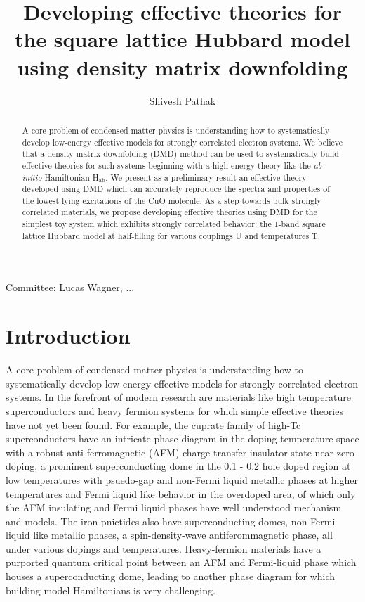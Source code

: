 \documentclass[12pt]{article}
\author{Shivesh Pathak}
\title{Developing effective theories for the square lattice Hubbard model using density matrix downfolding}
\begin{document}
\maketitle
\begin{abstract}
A core problem of condensed matter physics is understanding how to systematically develop low-energy effective models for strongly correlated electron systems. 
We believe that a density matrix downfolding (DMD) method can be used to systematically build effective theories for such systems beginning with a high energy theory like the \textit{ab-initio} Hamiltonian H$_\text{ab}$.
We present as a preliminary result an effective theory developed using DMD which can accurately reproduce the spectra and properties of the lowest lying excitations of the CuO molecule.
As a step towards bulk strongly correlated materials, we propose developing effective theories using DMD for the simplest toy system which exhibits strongly correlated behavior: the 1-band square lattice Hubbard model at half-filling for various couplings U and temperatures T.
\end{abstract}
Committee: Lucas Wagner, ...
\pagebreak

\section{Introduction}
A core problem of condensed matter physics is understanding how to systematically develop low-energy effective models for strongly correlated electron systems. 
In the forefront of modern research are materials like high temperature superconductors and heavy fermion systems for which simple effective theories have not yet been found. 
For example, the cuprate family of high-Tc superconductors have an intricate phase diagram in the doping-temperature space  with a robust anti-ferromagnetic (AFM) charge-transfer insulator state near zero doping, a prominent superconducting dome in the 0.1 - 0.2 hole doped region at low temperatures with psuedo-gap and non-Fermi liquid metallic phases at higher temperatures and Fermi liquid like behavior in the overdoped area, of which only the AFM insulating and Fermi liquid phases have well understood mechanism and models. 
The iron-pnictides also have superconducting domes, non-Fermi liquid like metallic phases, a spin-density-wave antiferommagnetic phase, all under various dopings and temperatures. 
Heavy-fermion materials have a purported quantum critical point between an AFM and Fermi-liquid phase which houses a superconducting dome, leading to another phase diagram for which building model Hamiltonians is very challenging. 
\end{document}
